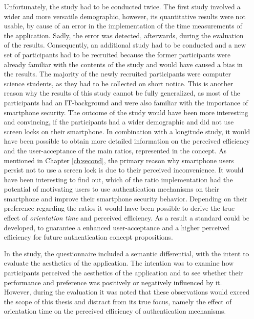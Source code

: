 Unfortunately, the study had to be conducted twice. The first study involved a wider and more versatile demographic, however, its quantitative results were not usable, by cause of an error in the implementation of the time measurements of the application. Sadly, the error was detected, afterwards, during the evaluation of the results. Consequently, an additional study had to be conducted and a new set of participants had to be recruited because the former participants were already familiar with the contents of the study and would have caused a bias in the results. The majority of the newly recruited participants were computer science students, as they had to be collected on short notice. This is another reason why the results of this study cannot be fully generalized, as most of the participants had an IT-background and were also familiar with the importance of smartphone security. The outcome of the study would have been more interesting and convincing, if the participants had a wider demographic and did not use screen locks on their smartphone. In combination with a longitude study, it would have been possible to obtain more detailed information on the perceived efficiency and the user-acceptance of the main ratios, represented in the concept. As mentioned in Chapter \ref{ch:second}, the primary reason why smartphone users persist not to use a screen lock is due to their perceived inconvenience. It would have been interesting to find out, which of the ratio implementation had the potential of motivating users to use authentication mechanisms on their smartphone and improve their smartphone security behavior. Depending on their preference regarding the ratios it would have been possible to derive the true effect of \textit{orientation time} and perceived efficiency. As a result a standard could be developed, to guarantee a enhanced user-acceptance and a higher perceived efficiency for future authentication concept propositions.

In the study, the questionnaire included a semantic differential, with the intent to evaluate the aesthetics of the application. The intention was to examine how participants perceived the aesthetics of the application and to see whether their performance and preference was positively or negatively influenced by it. However, during the evaluation it was noted that these observations would exceed the scope of this thesis and distract from its true focus, namely the effect of orientation time on the perceived efficiency of authentication mechanisms.  
